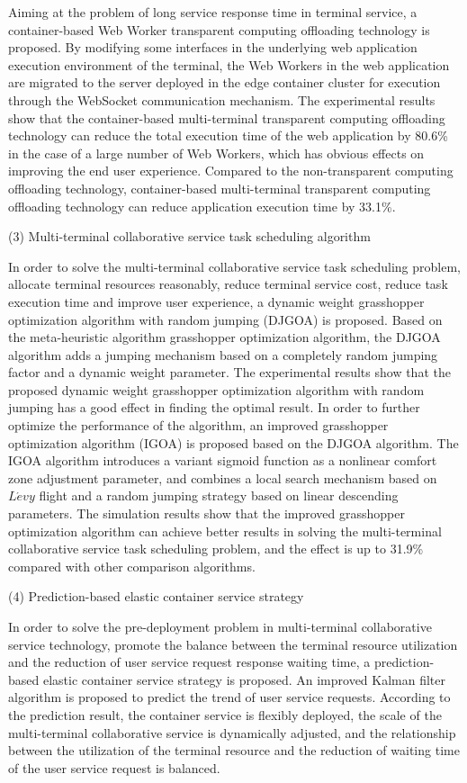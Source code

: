 Aiming at the problem of long service response time in terminal service, a container-based Web Worker transparent computing offloading technology is proposed. By modifying some interfaces in the underlying web application execution environment of the terminal, the Web Workers in the web application are migrated to the server deployed in the edge container cluster for execution through the WebSocket communication mechanism. The experimental results show that the container-based multi-terminal transparent computing offloading technology can reduce the total execution time of the web application by 80.6\% in the case of a large number of Web Workers, which has obvious effects on improving the end user experience. Compared to the non-transparent computing offloading technology, container-based multi-terminal transparent computing offloading technology can reduce application execution time by 33.1\%.

(3) Multi-terminal collaborative service task scheduling algorithm

In order to solve the multi-terminal collaborative service task scheduling problem, allocate terminal resources reasonably, reduce terminal service cost, reduce task execution time and improve user experience, a dynamic weight grasshopper optimization algorithm with random jumping (DJGOA) is proposed. Based on the meta-heuristic algorithm grasshopper optimization algorithm, the DJGOA algorithm adds a jumping mechanism based on a completely random jumping factor and a dynamic weight parameter. The experimental results show that the proposed dynamic weight grasshopper optimization algorithm with random jumping has a good effect in finding the optimal result. In order to further optimize the performance of the algorithm, an improved grasshopper optimization algorithm (IGOA) is proposed based on the DJGOA algorithm.
The IGOA algorithm introduces a variant sigmoid function as a nonlinear comfort zone adjustment parameter, and combines a local search mechanism based on $L\acute{e}vy$ flight and a random jumping strategy based on linear descending parameters.
The simulation results show that the improved grasshopper optimization algorithm can achieve better results in solving the multi-terminal collaborative service task scheduling problem, and the effect is up to 31.9\% compared with other comparison algorithms.

(4) Prediction-based  elastic container service strategy

In order to solve the pre-deployment problem in multi-terminal collaborative service technology, promote the balance between the terminal resource utilization and the reduction of user service request response waiting time, a prediction-based elastic container service strategy is proposed. An improved Kalman filter algorithm is proposed to predict the trend of user service requests. According to the prediction result, the container service is flexibly deployed, the scale of the multi-terminal collaborative service is dynamically adjusted, and the relationship between the utilization of the terminal resource and the reduction of waiting time of the user service request is balanced.


